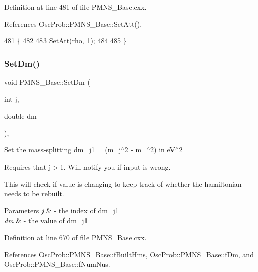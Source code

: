 Definition at line 481 of file P\+M\+N\+S\+\_\+\+Base.\+cxx.



References Osc\+Prob\+::\+P\+M\+N\+S\+\_\+\+Base\+::\+Set\+Att().


\begin{DoxyCode}
481                                                \{
482 
483   \hyperlink{classOscProb_1_1PMNS__Base_aba565962a440d14bee7a2a96d2eca2c5}{SetAtt}(rho, 1);
484 
485 \}
\end{DoxyCode}
\mbox{\label{classOscProb_1_1PMNS__Base_a492243b22fb1b783cd2943f507cff970}} 
\subsubsection{\texorpdfstring{Set\+Dm()}{SetDm()}}
{\footnotesize\ttfamily void P\+M\+N\+S\+\_\+\+Base\+::\+Set\+Dm (\begin{DoxyParamCaption}\item[{int}]{j,  }\item[{double}]{dm }\end{DoxyParamCaption})\hspace{0.3cm}{\ttfamily [virtual]}, {\ttfamily [inherited]}}

Set the mass-\/splitting dm\+\_\+j1 = (m\+\_\+j$^\wedge$2 -\/ m\+\_$^\wedge$2) in e\+V$^\wedge$2

Requires that j$>$1. Will notify you if input is wrong.

This will check if value is changing to keep track of whether the hamiltonian needs to be rebuilt.


\begin{DoxyParams}{Parameters}
{\em j} & -\/ the index of dm\+\_\+j1 \\
\hline
{\em dm} & -\/ the value of dm\+\_\+j1 \\
\hline
\end{DoxyParams}


Definition at line 670 of file P\+M\+N\+S\+\_\+\+Base.\+cxx.



References Osc\+Prob\+::\+P\+M\+N\+S\+\_\+\+Base\+::f\+Built\+Hms, Osc\+Prob\+::\+P\+M\+N\+S\+\_\+\+Base\+::f\+Dm, and Osc\+Prob\+::\+P\+M\+N\+S\+\_\+\+Base\+::f\+Num\+Nus.



